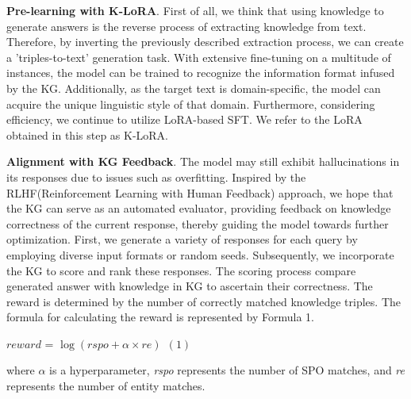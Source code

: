 \documentclass{article}
\begin{document}
\textbf{Pre-learning with K-LoRA}. First of all, we think that using knowledge to generate answers is the reverse process of extracting knowledge from text. Therefore, by inverting the previously described extraction process, we can create a 'triples-to-text' generation task. With extensive fine-tuning on a multitude of instances, the model can be trained to recognize the information format infused by the KG. Additionally, as the target text is domain-specific, the model can acquire the unique linguistic style of that domain. Furthermore, considering efficiency, we continue to utilize LoRA-based SFT. We refer to the LoRA obtained in this step as K-LoRA.

\textbf{Alignment with KG Feedback}. The model may still exhibit hallucinations in its responses due to issues such as overfitting. Inspired by the RLHF(Reinforcement Learning with Human Feedback) approach\cite{ouyang2022training,ziegler2019fine}, we hope that the KG can serve as an automated evaluator, providing feedback on knowledge correctness of the current response, thereby guiding the model towards further optimization. First, we generate a variety of responses for each query by employing diverse input formats or random seeds. Subsequently, we incorporate the KG to score and rank these responses. The scoring process compare generated answer with knowledge in KG to ascertain their correctness. The reward is determined by the number of correctly matched knowledge triples. The formula for calculating the reward is represented by Formula 1. 
    
    \begin{center}
    $reward$ = $\log(rspo + \alpha \times re) \ \  (1)$   
    \end{center}
    where $\alpha$ is a hyperparameter, \textit{rspo} represents the number of SPO matches, and \textit{re} represents the number of entity matches. 
\end{document}
